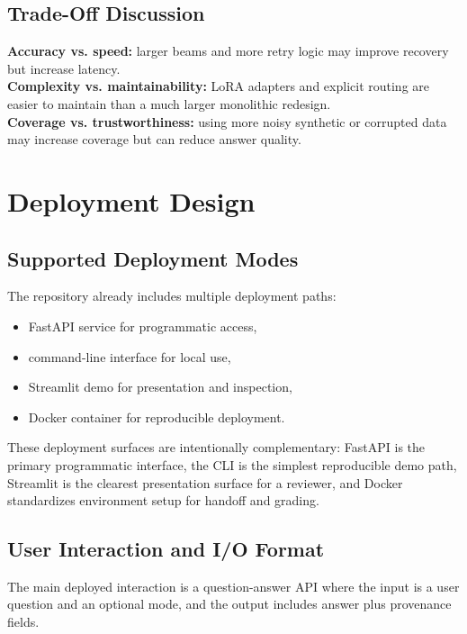 \documentclass[a4paper,11pt]{article}
\begin{document}
\subsection{Trade-Off Discussion}

\textbf{Accuracy vs. speed:} larger beams and more retry logic may improve recovery but increase latency. \\
\textbf{Complexity vs. maintainability:} LoRA adapters and explicit routing are easier to maintain than a much larger monolithic redesign. \\
\textbf{Coverage vs. trustworthiness:} using more noisy synthetic or corrupted data may increase coverage but can reduce answer quality.

\section{Deployment Design}

\subsection{Supported Deployment Modes}

The repository already includes multiple deployment paths:

\begin{itemize}[leftmargin=1.2cm]
  \item FastAPI service for programmatic access,
  \item command-line interface for local use,
  \item Streamlit demo for presentation and inspection,
  \item Docker container for reproducible deployment.
\end{itemize}

These deployment surfaces are intentionally complementary: FastAPI is the primary programmatic interface, the CLI is the simplest reproducible demo path, Streamlit is the clearest presentation surface for a reviewer, and Docker standardizes environment setup for handoff and grading.

\subsection{User Interaction and I/O Format}

The main deployed interaction is a question-answer API where the input is a user question and an optional mode, and the output includes answer plus provenance fields.
\end{document}
